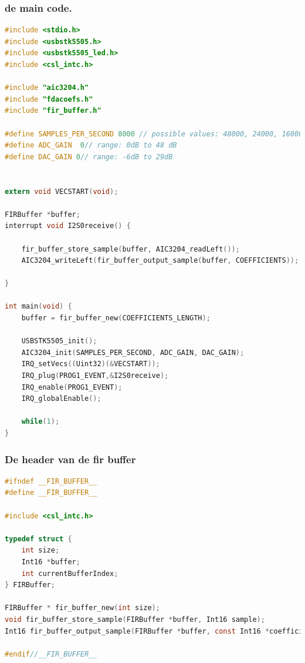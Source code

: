 \documentclass[11pt,a4paper]{article}
\begin{document}
	\subsubsection{de main code.}

	\begin{lstlisting}[language=c]
#include <stdio.h>
#include <usbstk5505.h>
#include <usbstk5505_led.h>
#include <csl_intc.h>

#include "aic3204.h"
#include "fdacoefs.h"
#include "fir_buffer.h"

#define SAMPLES_PER_SECOND 8000 // possible values: 48000, 24000, 16000, 12000, 9600, and 8000
#define ADC_GAIN  0// range: 0dB to 48 dB
#define DAC_GAIN 0// range: -6dB to 29dB


extern void VECSTART(void);

FIRBuffer *buffer;
interrupt void I2S0receive() {

    fir_buffer_store_sample(buffer, AIC3204_readLeft());
    AIC3204_writeLeft(fir_buffer_output_sample(buffer, COEFFICIENTS));

}

int main(void) {
    buffer = fir_buffer_new(COEFFICIENTS_LENGTH);

    USBSTK5505_init();
    AIC3204_init(SAMPLES_PER_SECOND, ADC_GAIN, DAC_GAIN);
    IRQ_setVecs((Uint32)(&VECSTART));
    IRQ_plug(PROG1_EVENT,&I2S0receive);
    IRQ_enable(PROG1_EVENT);
    IRQ_globalEnable();

    while(1);
}
	\end{lstlisting}
	\clearpage	

	\subsubsection{De header van de fir buffer}
	\begin{lstlisting}[language=c]
#ifndef __FIR_BUFFER__
#define __FIR_BUFFER__

#include <csl_intc.h>

typedef struct {
    int size;
    Int16 *buffer;
    int currentBufferIndex;
} FIRBuffer;

FIRBuffer * fir_buffer_new(int size);
void fir_buffer_store_sample(FIRBuffer *buffer, Int16 sample);
Int16 fir_buffer_output_sample(FIRBuffer *buffer, const Int16 *coefficients);

#endif//__FIR_BUFFER__

	\end{lstlisting}
	\clearpage
\end{document}
